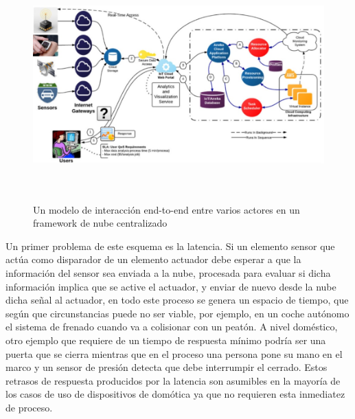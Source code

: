 \vspace{0.5cm}
\begin{figure}[hbt!]
\label{iotCloundComputing}
\centering
\includegraphics[height=3.5in]{figures/iotCloudComputing.jpg}
\caption[Un modelo de interacción end-to-end entre varios actores en un \gls{framework} de nube centralizado]{Un modelo de interacción end-to-end entre varios actores en un \gls{framework} de nube centralizado}
\end{figure}

Un primer problema de este esquema es la latencia. Si un elemento sensor que actúa como disparador de un elemento actuador debe esperar a que la información del sensor sea enviada a la nube, procesada para evaluar si dicha información implica que se active el actuador, y enviar de nuevo desde la nube dicha señal al actuador, en todo este proceso se genera un espacio de tiempo, que según que circunstancias puede no ser viable, por ejemplo, en un coche autónomo el sistema de frenado cuando va a colisionar con un peatón. A nivel doméstico, otro ejemplo que requiere de un tiempo de respuesta mínimo podría ser una puerta que se cierra mientras que en el proceso una persona pone su mano en el marco y un sensor de presión detecta que debe interrumpir el cerrado. Estos retrasos de respuesta producidos por la latencia son asumibles en la mayoría de los casos de uso de dispositivos de domótica ya que no requieren esta inmediatez de proceso.

\vspace{1cm}

